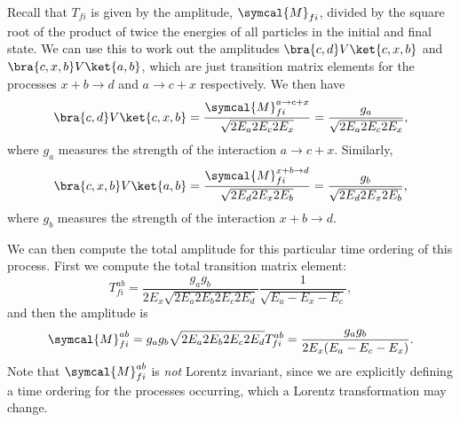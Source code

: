 \documentclass[fleqn]{NotesClass}
\newcommand{\amplitude}{\symcal{M}}
\begin{document}
    Recall that \(T_{fi}\) is given by the amplitude, \(\amplitude_{fi}\), divided by the square root of the product of twice the energies of all particles in the initial and final state.
    We can use this to work out the amplitudes \(\bra{c, d} V \ket{c, x, b}\) and \(\bra{c, x, b} V \ket{a, b}\), which are just transition matrix elements for the processes \(x + b \to d\) and \(a \to c + x\) respectively.
    We then have
    \begin{equation}
        \bra{c, d} V \ket{c, x, b} = \frac{\amplitude_{fi}^{a \to c + x}}{\sqrt{2E_a2E_c2E_x}} = \frac{g_a}{\sqrt{2E_a2E_c2E_x}},
    \end{equation}
    where \(g_a\) measures the strength of the interaction \(a \to c + x\).
    Similarly,
    \begin{equation}
        \bra{c, x, b} V \ket{a, b} = \frac{\amplitude_{fi}^{x + b \to d}}{\sqrt{2E_d2E_x2E_b}} = \frac{g_b}{\sqrt{2E_d2E_x2E_b}},
    \end{equation}
    where \(g_b\) measures the strength of the interaction \(x + b \to d\).
    
    We can then compute the total amplitude for this particular time ordering of this process.
    First we compute the total transition matrix element:
    \begin{equation}
        T_{fi}^{ab} = \frac{g_ag_b}{2E_x\sqrt{2E_a2E_b2E_c2E_d}} \frac{1}{\sqrt{E_a - E_x - E_c}},
    \end{equation}
    and then the amplitude is
    \begin{equation}
        \amplitude_{fi}^{ab} = g_ag_b \sqrt{2E_a2E_b2E_c2E_d} T_{fi}^{ab} = \frac{g_ag_b}{2E_x(E_a - E_c - E_x)}.
    \end{equation}
    Note that \(\amplitude_{fi}^{ab}\) is \emph{not} Lorentz invariant, since we are explicitly defining a time ordering for the processes occurring, which a Lorentz transformation may change.
    
\end{document}
